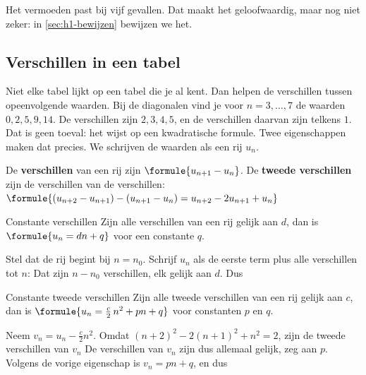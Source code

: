 Het vermoeden past bij vijf gevallen. Dat maakt het geloofwaardig, maar nog niet zeker: in \ref{sec:h1-bewijzen} bewijzen we het.

\begin{oefeningen}
\end{oefeningen}

\subsection{Verschillen in een tabel}

Niet elke tabel lijkt op een tabel die je al kent. Dan helpen de verschillen tussen opeenvolgende waarden. Bij de diagonalen vind je voor $n = 3, \ldots, 7$ de waarden $0, 2, 5, 9, 14$. De verschillen zijn $2, 3, 4, 5$, en de verschillen daarvan zijn telkens $1$. Dat is geen toeval: het wijst op een kwadratische formule. Twee eigenschappen maken dat precies. We schrijven de waarden als een rij $u_n$.

\begin{theorie}
De \textbf{\textcolor{accent}{verschillen}} van een rij zijn $\formule{u_{n+1} - u_n}$. De \textbf{\textcolor{accent}{tweede verschillen}} zijn de verschillen van de verschillen: \quad $\formule{(u_{n+2} - u_{n+1}) - (u_{n+1} - u_n) = u_{n+2} - 2u_{n+1} + u_n}$

\begin{stelling}{Constante verschillen}
Zijn alle verschillen van een rij gelijk aan $d$, dan is \quad $\formule{u_n = dn + q}$ \quad voor een constante $q$.
\end{stelling}

\begin{bewijs}
Stel dat de rij begint bij $n = n_0$. Schrijf $u_n$ als de eerste term plus alle verschillen tot $n$:
Dat zijn $n - n_0$ verschillen, elk gelijk aan $d$. Dus
\end{bewijs}

\begin{stelling}{Constante tweede verschillen}
Zijn alle tweede verschillen van een rij gelijk aan $c$, dan is \quad $\formule{u_n = \tfrac{c}{2}\,n^2 + pn + q}$ \quad voor constanten $p$ en $q$.
\end{stelling}

\begin{bewijs}
Neem $v_n = u_n - \frac{c}{2}n^2$. Omdat $(n + 2)^2 - 2(n + 1)^2 + n^2 = 2$, zijn de tweede verschillen van $v_n$
De verschillen van $v_n$ zijn dus allemaal gelijk, zeg aan $p$. Volgens de vorige eigenschap is $v_n = pn + q$, en dus
\end{bewijs}
\end{theorie}

